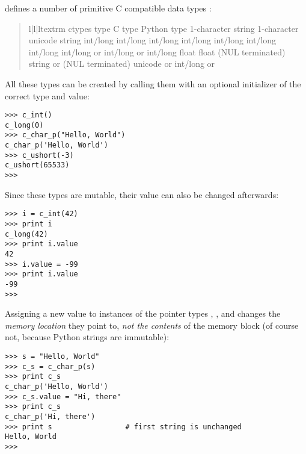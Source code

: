  defines a number of primitive C compatible data types :
\begin{quote}
\begin{tableiii}{l|l|l}{textrm}
{
ctypes type
}
{
C type
}
{
Python type
}
{
}
{
1-character
string
}
{
}
{
1-character
unicode string
}
{
}
{
int/long
}
{
}
{
int/long
}
{
}
{
int/long
}
{
}
{
int/long
}
{
}
{
int/long
}
{
}
{
int/long
}
{
}
{
int/long
}
{
}
{
int/long
}
{
 or
}
{
int/long
}
{
 or
}
{
int/long
}
{
}
{
float
}
{
}
{
float
}
{
(NUL terminated)
}
{
string or
}
{
(NUL terminated)
}
{
unicode or
}
{
}
{
int/long
or 
}
\end{tableiii}
\end{quote}

All these types can be created by calling them with an optional
initializer of the correct type and value:
\begin{verbatim}
>>> c_int()
c_long(0)
>>> c_char_p("Hello, World")
c_char_p('Hello, World')
>>> c_ushort(-3)
c_ushort(65533)
>>>
\end{verbatim}

Since these types are mutable, their value can also be changed
afterwards:
\begin{verbatim}
>>> i = c_int(42)
>>> print i
c_long(42)
>>> print i.value
42
>>> i.value = -99
>>> print i.value
-99
>>>
\end{verbatim}

Assigning a new value to instances of the pointer types ,
, and  changes the \emph{memory location} they
point to, \emph{not the contents} of the memory block (of course not,
because Python strings are immutable):
\begin{verbatim}
>>> s = "Hello, World"
>>> c_s = c_char_p(s)
>>> print c_s
c_char_p('Hello, World')
>>> c_s.value = "Hi, there"
>>> print c_s
c_char_p('Hi, there')
>>> print s                 # first string is unchanged
Hello, World
>>>
\end{verbatim}

